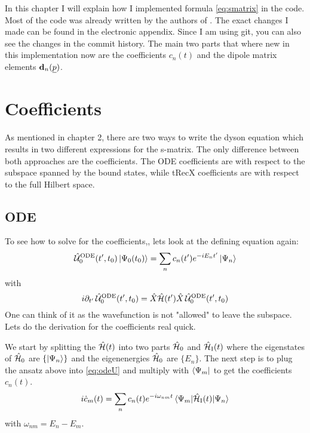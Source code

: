 In this chapter I will explain how I implemented formula \eqref{eq:smatrix} in the code.
Most of the code was already written by the authors of \cite{Theory_NPS}.
The exact changes I made can be found in the electronic appendix.
Since I am using git, you can also see the changes in the commit history.
The main two parts that where new in this implementation now are the coefficients $c_n(t)$ and the dipole matrix elements $\mathbf{d}_n(\underline{p})$.






\section{Coefficients}
As mentioned in chapter 2, there are two ways to write the dyson equation which results in two different expressions for the s-matrix.
The only difference between both approaches are the coefficients. 
The ODE coefficients are with respect to the subspace spanned by the bound states, while tRecX coefficients are with respect to the full Hilbert space.







\subsection{ODE}
To see how to solve for the coefficients,, lets look at the defining equation again:
\begin{equation*}
    \hat{\mathcal{U}}^{\mathrm{ODE}}_0(t',t_0)\ket{\Psi_0(t_0)} = \sum_{n}c_n(t')e^{-iE_nt'}\ket{\Psi_n}
\end{equation*}
with
\begin{equation}
    i\partial_{t'} \, \hat{\mathcal{U}}^{\mathrm{ODE}}_0(t',t_0) = \hat{X}\hat{\mathcal{H}}(t')\hat{X}\,\hat{\mathcal{U}}^{\mathrm{ODE}}_0(t',t_0)    \label{eq:odeU}
\end{equation}
One can think of it as the wavefunction is not "allowed" to leave the subspace. 
Lets do the derivation for the coefficients real quick.

We start by splitting the $\hat{\mathcal{H}}(t)$ into two parts $\hat{\mathcal{H}}_0$ and $\hat{\mathcal{H}}_{\mathrm{I}}(t)$ where the eigenstates of $\hat{\mathcal{H}}_0$ are $\{\ket{\Psi_n}\}$ and the eigenenergies $\hat{\mathcal{H}}_0$ are $\{E_n\}$. 
The next step is to plug the ansatz above into \eqref{eq:odeU} and multiply with $\bra{\Psi_m}$ to get the coefficients $c_n(t)$.
\begin{equation*}
    i  \dot{c}_m(t) = \sum_n c_n(t) e^{-i \omega_{nm} t} \braket{\Psi_m|\hat{\mathcal{H}}_{\mathrm{I}}(t)|\Psi_n}  \label{eq:ode}
\end{equation*}
with $\omega_{nm} = E_n - E_m$.

